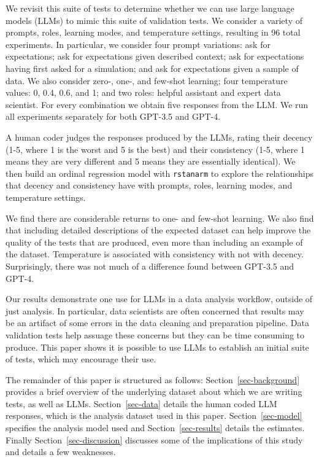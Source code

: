 \documentclass[
  letterpaper,
  DIV=11,
  numbers=noendperiod]{scrartcl}
\begin{document}
We revisit this suite of tests to determine whether we can use large
language models (LLMs) to mimic this suite of validation tests. We
consider a variety of prompts, roles, learning modes, and temperature
settings, resulting in 96 total experiments. In particular, we consider
four prompt variations: ask for expectations; ask for expectations given
described context; ask for expectations having first asked for a
simulation; and ask for expectations given a sample of data. We also
consider zero-, one-, and few-shot learning; four temperature values: 0,
0.4, 0.6, and 1; and two roles: helpful assistant and expert data
scientist. For every combination we obtain five responses from the LLM.
We run all experiments separately for both GPT-3.5 and GPT-4.

A human coder judges the responses produced by the LLMs, rating their
decency (1-5, where 1 is the worst and 5 is the best) and their
consistency (1-5, where 1 means they are very different and 5 means they
are essentially identical). We then build an ordinal regression model
with \texttt{rstanarm} to explore the relationships that decency and
consistency have with prompts, roles, learning modes, and temperature
settings.

We find there are considerable returns to one- and few-shot learning. We
also find that including detailed descriptions of the expected dataset
can help improve the quality of the tests that are produced, even more
than including an example of the dataset. Temperature is associated with
consistency with not with decency. Surprisingly, there was not much of a
difference found between GPT-3.5 and GPT-4.

Our results demonstrate one use for LLMs in a data analysis workflow,
outside of just analysis. In particular, data scientists are often
concerned that results may be an artifact of some errors in the data
cleaning and preparation pipeline. Data validation tests help assuage
these concerns but they can be time consuming to produce. This paper
shows it is possible to use LLMs to establish an initial suite of tests,
which may encourage their use.

The remainder of this paper is structured as follows:
Section~\ref{sec-background} provides a brief overview of the underlying
dataset about which we are writing tests, as well as LLMs.
Section~\ref{sec-data} details the human coded LLM responses, which is
the analysis dataset used in this paper. Section~\ref{sec-model}
specifies the analysis model used and Section~\ref{sec-results} details
the estimates. Finally Section~\ref{sec-discussion} discusses some of
the implications of this study and details a few weaknesses.
\end{document}
